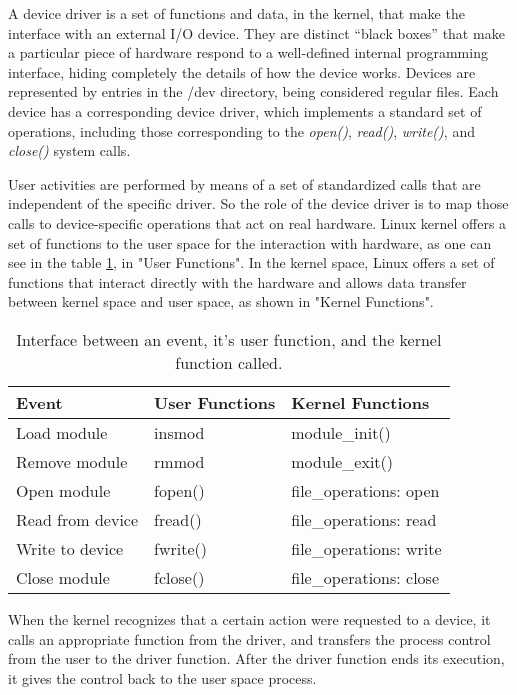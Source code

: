 A device driver is a set of functions and data, in the kernel, that make the interface with an external I/O device. They are distinct “black boxes” that make a particular piece of hardware respond to a well-defined internal programming interface, hiding completely the details of how the device works. Devices  are  represented  by  entries  in  the  /dev  directory, being considered regular files.  Each  device  has  a  corresponding device driver, which implements a standard set of operations, including those  corresponding  to  the  \textit{open()},  \textit{read()}, \textit{ write()},  and  \textit{close()}  system  calls. \cite{linux_dev_drivers}

User activities are performed by means of a set of standardized calls that are independent of the specific driver. So the role of the device driver is to map those calls to device-specific operations that act on real hardware. Linux kernel offers a set of functions to the user space for the interaction with hardware, as one can see in the table \ref{table:device_driver}, in "User Functions". In the kernel space, Linux offers a set of functions that interact directly with the hardware and allows data transfer between kernel space and user space, as shown in "Kernel Functions".

\begin{table}[H]
	\centering
	\resizebox{\columnwidth}{!}
	{
		\begin{tabular}{|m{4cm}|m{3.5cm}|m{5cm}|}
			\hline
			\textbf{Event} & \textbf{User Functions} & \textbf{Kernel Functions}
			\\\hline\hline
			Load module & insmod & module\_init()
			\\\hline
			Remove module & rmmod & module\_exit()
			\\\hline
			Open module & fopen() & file\_operations: open
			\\\hline
			Read from device & fread() & file\_operations: read
			\\\hline
			Write to device & fwrite() & file\_operations: write
			\\\hline
			Close module & fclose() & file\_operations: close
			\\\hline
		\end{tabular}
	}
	\caption{Interface between an event, it's user function, and the kernel function called.}
	\label{table:device_driver}
\end{table}

When the kernel recognizes that a certain action were requested to a device, it calls an appropriate function from the driver, and transfers the process control from the user to the driver function. After the driver function ends its execution, it gives the control back to the user space process.

